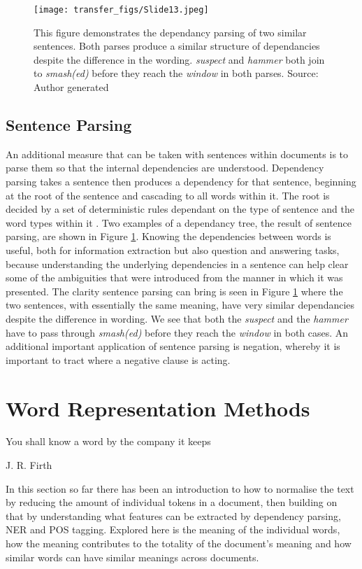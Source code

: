 \begin{figure}
  \texttt{[image: transfer\_figs/Slide13.jpeg]}
  \caption[Sentence Dependancy Parse.]{This figure demonstrates the dependancy parsing of two similar sentences. Both parses produce a similar structure of dependancies despite the difference in the wording. \emph{suspect} and \emph{hammer} both join to \emph{smash(ed)} before they reach the \emph{window} in both parses. Source: Author generated}
  \label{fig:dep}
\end{figure}


\subsection{Sentence Parsing} An additional measure that can be taken with sentences within documents is to parse them so that the internal dependencies are understood. Dependency parsing takes a sentence then produces a dependency for that sentence, beginning at the root of the sentence and cascading to all words within it. The root is decided by a set of deterministic rules dependant on the type of sentence and the word types within it  \parencite{eisenstein2018natural}.  Two examples of a dependancy tree, the result of sentence parsing, are shown in Figure  \ref{fig:dep}. Knowing the dependencies between words is useful, both for information extraction but also question and answering tasks, because understanding the underlying dependencies in a sentence can help clear some of the ambiguities that were introduced from the manner in which it was presented. The clarity sentence parsing can bring is seen in Figure \ref{fig:dep} where the two sentences, with essentially the same meaning, have very similar dependancies despite the difference in wording. We see that both the \emph{suspect} and the \emph{hammer} have to pass through \emph{smash(ed)} before they reach the \emph{window} in both cases. An additional important application of sentence parsing is negation, whereby it is important to tract where a negative clause is acting. 


\section{Word Representation Methods}


\epigraph{\centering You shall know a word by the company it keeps}{J. R. Firth}


In this section so far there has been an introduction to how to normalise the text by reducing the amount of individual tokens in a document, then building on that by understanding what features can be extracted by dependency parsing, NER and POS tagging. Explored here is the meaning of the individual words, how the meaning contributes to the totality of the document’s meaning and how similar words can have similar meanings across documents.


